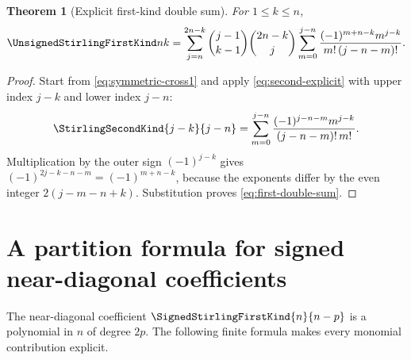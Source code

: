 \documentclass[11pt,a4paper,oneside,openany]{book}
\newtheorem{theorem}{Theorem}[chapter]
\theoremstyle{definition}
\theoremstyle{remark}
\begin{document}
\begin{theorem}[Explicit first-kind double sum]
\label{thm:first-double-sum}
For $1\le k\le n$,
\begin{equation}
\label{eq:first-double-sum}
 \UnsignedStirlingFirstKind nk
 =\sum_{j=n}^{2n-k}\binom{j-1}{k-1}\binom{2n-k}{j}
   \sum_{m=0}^{j-n}
   \frac{(-1)^{m+n-k}m^{j-k}}{m!\,(j-n-m)!}.
\end{equation}
\end{theorem}
\begin{proof}
Start from \eqref{eq:symmetric-cross1} and apply
\eqref{eq:second-explicit} with upper index $j-k$ and lower index $j-n$:
\[
 \StirlingSecondKind{j-k}{j-n}
 =\sum_{m=0}^{j-n}
   \frac{(-1)^{j-n-m}m^{j-k}}{(j-n-m)!\,m!}.
\]
Multiplication by the outer sign $(-1)^{j-k}$ gives
$(-1)^{2j-k-n-m}=(-1)^{m+n-k}$, because the exponents differ by the even integer
$2(j-m-n+k)$.  Substitution proves \eqref{eq:first-double-sum}.
\end{proof}

\section{A partition formula for signed near-diagonal coefficients}
The near-diagonal coefficient $\SignedStirlingFirstKind{n}{n-p}$ is a polynomial in $n$ of degree $2p$.
The following finite formula makes every monomial contribution explicit.
\end{document}
